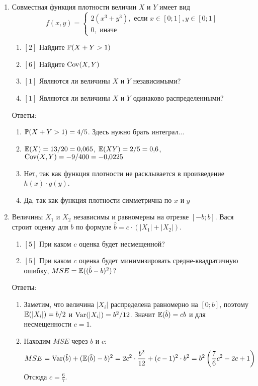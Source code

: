 \documentclass[pdftex,12pt,a4paper]{article}
\begin{document}
\begin{enumerate}

\item Совместная функция плотности величин $X$ и $Y$ имеет вид
\begin{equation}
f(x,y)=\begin{cases}
2(x^3+y^3), \mbox{ если } x\in [0;1], y\in [0;1] \\
0, \mbox{ иначе}
\end{cases} 
\end{equation}
\begin{enumerate}
\item $[2]$ Найдите $\P(X+Y>1)$
\item $[6]$ Найдите $\Cov(X,Y)$
\item $[1]$ Являются ли величины $X$ и $Y$ независимыми? 
\item $[1]$ Являются ли величины $X$ и $Y$ одинаково распределенными?
\end{enumerate}

Ответы:
\begin{enumerate}
\item $\P(X+Y>1)=4/5$. Здесь нужно брать интеграл...
\item $\E(X)=13/20=0{,}065$, $\E(XY)=2/5=0{,}6$, $\Cov(X,Y)=-9/400=-0{,}0225$
\item Нет, так как функция плотности не расклывается в произведение $h(x)\cdot g(y)$.
\item Да, так как функция плотности симметрична по $x$ и $y$
\end{enumerate}


\item Величины $X_1$ и $X_2$ независимы и равномерны на отрезке $[-b;b]$. Вася строит оценку для $b$ по формуле $\hat{b}=c\cdot (|X_{1}|+|X_{2}|)$. 
\begin{enumerate}
\item $[5]$ При каком $c$ оценка будет несмещенной? 
\item $[5]$ При каком $c$ оценка будет минимизировать средне-квадратичную ошибку, $MSE=\E((\hat{b}-b)^{2})$? 
\end{enumerate}

Ответы:
\begin{enumerate}
\item Заметим, что величина $|X_i|$ распределена равномерно на $[0;b]$, поэтому $\E(|X_i|)=b/2$ и $\Var(|X_i|)=b^2/12$. Значит $\E(\hat{b})=cb$ и для несмещенности $c=1$.
\item Находим $MSE$ через $b$ и $c$:
\begin{equation}
MSE=\Var(\hat{b})+(\E(\hat{b})-b)^2=2c^2\cdot \frac{b^2}{12}+(c-1)^2\cdot b^2=b^2\left(\frac{7}{6}c^2-2c+1\right)
\end{equation}
Отсюда $c=\frac{6}{7}$.
\end{enumerate}



\end{enumerate}
\end{document}

